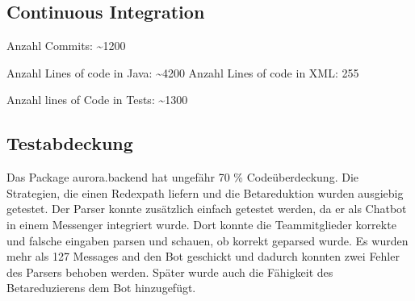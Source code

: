 \documentclass[parskip=full,11pt,twoside]{scrartcl}
\begin{document}
\subsection{Continuous Integration}
Anzahl Commits: \textasciitilde  1200\newline

Anzahl Lines of code in Java: \textasciitilde 4200
Anzahl Lines of code in XML: 255

Anzahl lines of Code in Tests: \textasciitilde 1300


\subsection{Testabdeckung}
Das Package aurora.backend hat ungefähr 70 \% Codeüberdeckung.
Die Strategien, die einen Redexpath liefern und die Betareduktion wurden ausgiebig getestet.
Der Parser konnte zusätzlich einfach getestet werden, da er als Chatbot in einem Messenger integriert wurde.
Dort konnte die Teammitglieder korrekte und falsche eingaben parsen und schauen,
ob korrekt geparsed wurde.
Es wurden mehr als 127 Messages and den Bot geschickt und dadurch konnten zwei
Fehler des Parsers behoben werden.
Später wurde auch die Fähigkeit des Betareduzierens dem Bot hinzugefügt.
\newpage
\end{document}
